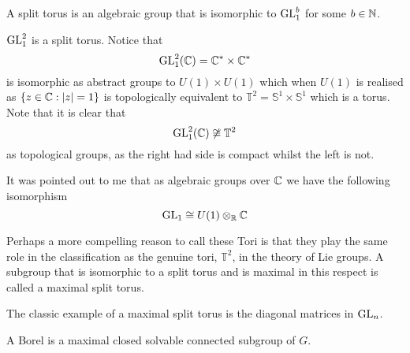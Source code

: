     \begin{definition}
        A split torus is an algebraic group that is isomorphic to \(\operatorname{GL}_1^b\) for some \(b\in\N\).
    \end{definition}

    \begin{example}
        \(\operatorname{GL}^2_1\) is a split torus. Notice that 
        \[\GL^2_1(\C) = \C^\ast\times \C^\ast\]
        is isomorphic as abstract groups to \(U(1)\times U(1)\) which when \(U(1)\) is realised as \(\{z\in \C : |z| = 1\}\) is topologically equivalent to \(\mathbb{T}^2 = \mathbb{S}^1\times \mathbb{S}^1 \) which is a torus. Note that it is clear that 
        \[\GL^2_1(\C) \not\cong \mathbb{T}^2 \]
        as topological groups, as the right had side is compact whilst the left is not.

        It was pointed out to me that as algebraic groups over \(\C\) we have the following isomorphism
        \[\GL_1 \cong U(1)\tensor_\R \C\]
    \end{example}
    
     Perhaps a more compelling reason to call these Tori is that they play the same role in the classification as the genuine tori, \(\mathbb{T}^2\), in the theory of Lie groups. A subgroup that is isomorphic to a split torus and is maximal in this respect is called a maximal split torus. 
     \begin{example}
        The classic example of a maximal split torus is the diagonal matrices in \(\operatorname{GL}_n\).
     \end{example}

    \begin{definition}
        A Borel is a maximal closed solvable connected subgroup of \(G\).
    \end{definition}

